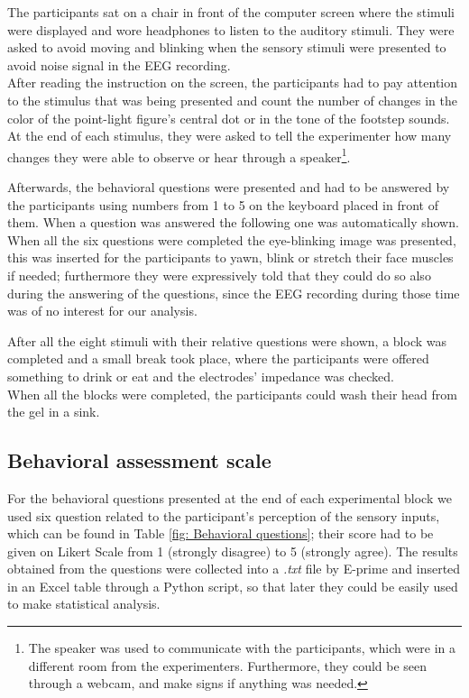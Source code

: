 The participants sat on a chair in front of the computer screen where the stimuli were displayed and wore headphones to listen to the auditory stimuli. They were asked to avoid moving and blinking when the sensory stimuli were presented to avoid noise signal in the EEG recording. \\
After reading the instruction on the screen, the participants had to pay attention to the stimulus that was being presented and count the number of changes in the color of the point-light figure's central dot or in the tone of the footstep sounds. At the end of each stimulus, they were asked to tell the experimenter how many changes they were able to observe or hear through a speaker\footnote{The speaker was used to communicate with the participants, which were in a different room from the experimenters. Furthermore, they could be seen through a webcam, and make signs if anything was needed.}. 

Afterwards, the behavioral questions were presented and had to be answered by the participants using numbers from 1 to 5 on the keyboard placed in front of them. When a question was answered the following one was automatically shown. When all the six questions were completed the eye-blinking image was presented, this was inserted for the participants to yawn, blink or stretch their face muscles if needed; furthermore they were expressively told that they could do so also during the answering of the questions, since the EEG recording during those time was of no interest for our analysis.  

After all the eight stimuli with their relative questions were shown, a block was completed and a small break took place, where the participants were offered something to drink or eat and the electrodes' impedance was checked. \\
When all the blocks were completed, the participants could wash their head from the gel in a sink.

\subsection*{Behavioral assessment scale}
For the behavioral questions presented at the end of each experimental block we used six question related to the participant's perception of the sensory inputs, which can be found in Table \ref{fig: Behavioral questions}; their score had to be given on Likert Scale from 1 (strongly disagree) to 5 (strongly agree). The results obtained from the questions were collected into a \textit{.txt} file by E-prime and inserted in an Excel table through a Python script, so that later they could be easily used to make statistical analysis. 

